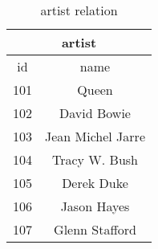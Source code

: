 \documentclass{article}
\begin{document}
\par
\begin{table}[h]
\centering
\caption{artist relation}
\label{my-label}
\begin{tabular}{|c|c|}
\hline
\multicolumn{2}{|c|}{artist} \\ \hline
id     & name                \\ \hline
101    & Queen               \\ \hline
102    & David Bowie         \\ \hline
103    & Jean Michel Jarre   \\ \hline
104    & Tracy W. Bush       \\ \hline
105    & Derek Duke          \\ \hline
106    & Jason Hayes         \\ \hline
107    & Glenn Stafford      \\ \hline
\end{tabular}
\end{table}
\end{document}
